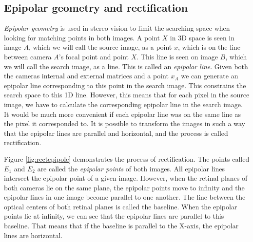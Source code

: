 \documentclass[a4paper]{article}
\begin{document}
\subsection{Epipolar geometry and rectification}
\label{recttheory}
\emph{Epipolar geometry} is used in stereo vision to limit the searching space
when looking for matching points in both images. A point $X$ in 3D space is seen
in image $A$, which we will call the source image, as a point $x$, which is on
the line between camera $A$'s focal point and point $X$. This line is seen on
image $B$, which we will call the search image, as a line. This is called an
\emph{epipolar line}. Given both the cameras internal and external matrices and
a point $x_A$ we can generate an epipolar line corresponding to this point in
the search image. This constrains the search space to this 1D line. However,
this means that for each pixel in the source image, we have to calculate the
corresponding epipolar line in the search image. It would be much more
convenient if each epipolar line was on the same line as the pixel it
corresponded to. It is possible to transform the images in such a way that the
epipolar lines are parallel and horizontal, and the process is called
rectification.

Figure \ref{fig:rectepipole} demonstrates the process of rectification.  The
points called $E_{1}$ and $E_{2}$ are called the \emph{epipolar points} of both
images. All epipolar lines intersect the epipolar point of a given image.
However, when the retinal planes of both cameras lie on the same plane, the
epipolar points move to infinity and the epipolar lines in one image become
parallel to one another. The line between the optical centers of both retinal
planes is called the baseline. When the epipolar points lie at infinity, we can
see that the epipolar lines are parallel to this baseline. That means that if
the baseline is parallel to the X-axis, the epipolar lines are horizontal.
\end{document}
